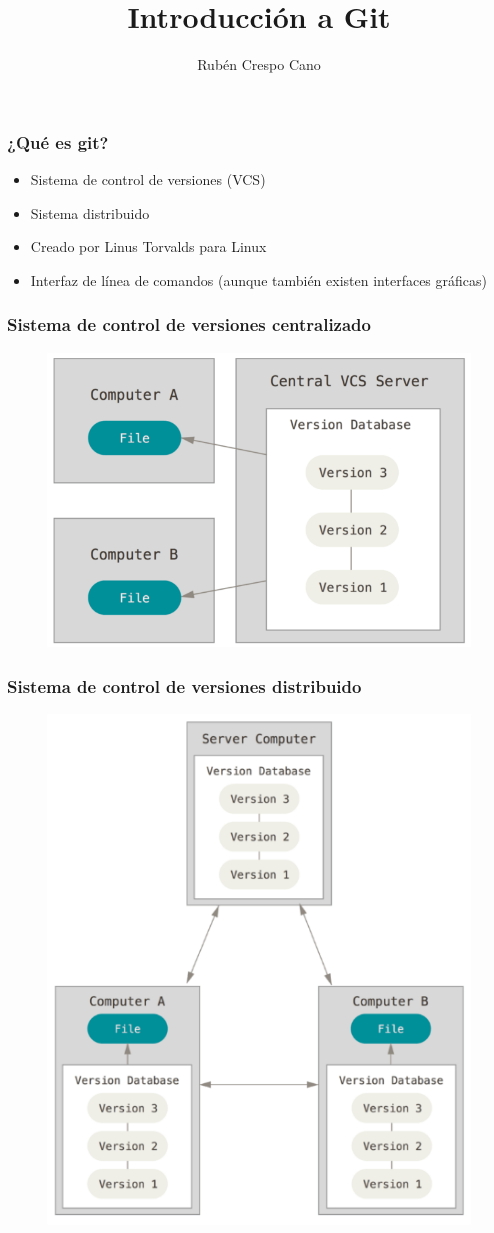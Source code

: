 \documentclass{beamer}
\title[Introducción a Git]{Introducción a Git}
\author{Rubén Crespo Cano}
\institute[]
{
https://about.me/rubencrespocano \\
\medskip
\textit{@rcrespocano}
}
\date{}
\begin{document}
\begin{frame}
\titlepage
\end{frame}

\begin{frame}
\frametitle{¿Qué es git?}
\begin{itemize}
\item Sistema de control de versiones (VCS)
\item Sistema distribuido
\item Creado por Linus Torvalds para Linux
\item Interfaz de línea de comandos (aunque también existen interfaces gráficas)
\end{itemize}
\end{frame}

\begin{frame}
\frametitle{Sistema de control de versiones centralizado}
\begin{figure}
\includegraphics[width=0.50\linewidth]{centralized.png}
\end{figure}
\end{frame}

\begin{frame}
\frametitle{Sistema de control de versiones distribuido}
\begin{figure}
\includegraphics[width=0.50\linewidth]{distributed.png}
\end{figure}
\end{frame}
\end{document}
